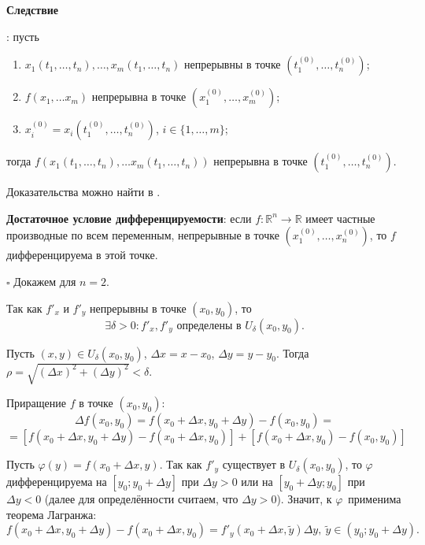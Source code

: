 \documentclass[12pt, a4paper, reqno]{article}
\begin{document}
    \hypertarget{continuity-implication}{\textbf{Следствие}}: пусть
    \begin{enumerate}
        \item $x_1(t_1, \ldots, t_n), \ldots, x_m(t_1, \ldots, t_n)$ непрерывны в точке
              $(t_1^{(0)}, \ldots, t_n^{(0)})$;
        \item $f(x_1, \ldots x_m)$ непрерывна в точке $(x_1^{(0)}, \ldots, x_m^{(0)})$;
        \item $x_i^{(0)} = x_i(t_1^{(0)}, \ldots, t_n^{(0)})$, $i \in \{1, \ldots, m\}$;
    \end{enumerate}
    тогда $f(x_1(t_1, \ldots, t_n), \ldots x_m(t_1, \ldots, t_n))$ непрерывна в точке
    $(t_1^{(0)}, \ldots, t_n^{(0)})$.

    Доказательства можно найти в \cite{petrovich-2}.

    \textbf{Достаточное условие дифференцируемости}: если $f: \mathbb{R}^n \to \mathbb{R}$ имеет
    частные производные по всем переменным, непрерывные в точке $(x_1^{(0)}, \ldots, x_n^{(0)})$,
    то $f$ дифференцируема в этой точке.

    $\square$
    Докажем для $n = 2$.

    Так как $f'_x$ и $f'_y$ непрерывны в точке $(x_0, y_0)$, то
    \begin{equation*}
        \exists \delta > 0: f'_x, f'_y\text{ определены в } U_{\delta}(x_0, y_0).
    \end{equation*}

    Пусть $(x, y) \in U_{\delta}(x_0, y_0)$, $\Delta x = x - x_0$, $\Delta y = y - y_0$. Тогда
    $\rho = \sqrt{(\Delta x)^2 + (\Delta y)^2} < \delta$.

    Приращение $f$ в точке $(x_0, y_0)$:
    \begin{equation*}
        \Delta f(x_0, y_0) = f(x_0 + \Delta x, y_0 + \Delta y) - f(x_0, y_0) =
    \end{equation*}
    \begin{equation*}
        = [f(x_0 + \Delta x, y_0 + \Delta y) - f(x_0 + \Delta x, y_0)] +
          [f(x_0 + \Delta x, y_0) - f(x_0, y_0)]
    \end{equation*}

    Пусть $\varphi(y) = f(x_0 + \Delta x, y)$. Так как $f'_y$ существует в $U_{\delta}(x_0, y_0)$,
    то $\varphi$ дифференцируема на $[y_0; y_0 + \Delta y]$ при $\Delta y > 0$ или на $[y_0 + \Delta y; y_0]$
    при $\Delta y < 0$ (далее для определённости считаем, что $\Delta y > 0$). Значит, к $\varphi$\
    применима теорема Лагранжа:
    \begin{equation*}
        f(x_0 + \Delta x, y_0 + \Delta y) - f(x_0 + \Delta x, y_0) =
        f'_y(x_0 + \Delta x, \tilde{y}) \Delta y,\ \tilde{y} \in (y_0; y_0 + \Delta y).
    \end{equation*}
\end{document}
